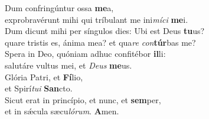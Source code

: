 \evenverse Dum confringúntur ossa \textbf{me}a,~\*\\
\evenverse exprobravérunt mihi qui tríbulant me ini\textit{mí}\textit{ci} \textbf{me}i.\\
\oddverse Dum dicunt mihi per síngulos dies: Ubi est Deus \textbf{tu}us?~\*\\
\oddverse quare tristis es, ánima mea? et qua\textit{re} \textit{con}\textbf{túr}bas me?\\
\evenverse Spera in Deo, quóniam adhuc confitébor \textbf{il}li:~\*\\
\evenverse salutáre vultus mei, et \textit{De}\textit{us} \textbf{me}us.\\
\oddverse Glória Patri, et \textbf{Fí}lio,~\*\\
\oddverse et Spirí\textit{tu}\textit{i} \textbf{San}cto.\\
\evenverse Sicut erat in princípio, et nunc, et \textbf{sem}per,~\*\\
\evenverse et in sǽcula sæcu\textit{ló}\textit{rum}. \textbf{A}men.\\
